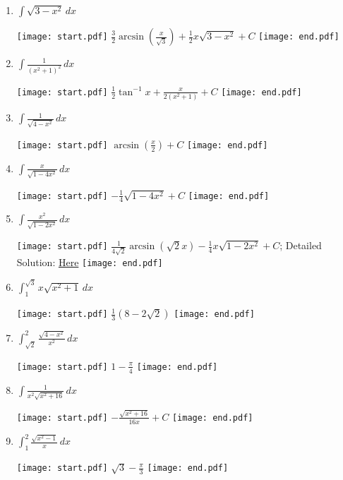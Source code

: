 \documentclass[12pt]{article}
\begin{document}
\begin{enumerate}

\item $\int \sqrt{3-x^2}\,dx$ 

\texttt{[image: start.pdf]}
{{$\frac{3}{2}\arcsin{\left(\frac{x}{\sqrt{3}}\right)}+\frac{1}{2}x\sqrt{3-x^2}+C$}}
\texttt{[image: end.pdf]}


\item $\int \frac{1}{(x^2+1)^2}\,dx$ 

\texttt{[image: start.pdf]}
{{$\frac{1}{2}\tan^{-1}{x}+\frac{x}{2(x^2+1)}+C$}}
\texttt{[image: end.pdf]}


\item $\int \frac{1}{\sqrt{4-x^2}}\,dx$ 

\texttt{[image: start.pdf]}
{{$\arcsin{\left(\frac{x}{2}\right)+C}$}}
\texttt{[image: end.pdf]}


\item $\int \frac{x}{\sqrt{1-4x^2}}\,dx$ 

\texttt{[image: start.pdf]}
{{$-\frac{1}{4}\sqrt{1-4x^2}+C$}}
\texttt{[image: end.pdf]}


\item $\int \frac{x^2}{\sqrt{1-2x^2}}\,dx$ 

\texttt{[image: start.pdf]}
{{$\frac{1}{4\sqrt{2}}\arcsin{(\sqrt{2}x)}-\frac{1}{4}x\sqrt{1-2x^2}+C$; Detailed Solution: \textcolor{blue}{\href{http://www.math.drexel.edu/classes/Calculus/resources/Math122HW/Solutions/122_16_Trig_Sub_05.pdf}{Here}}}}
\texttt{[image: end.pdf]}


\item $\int^{\sqrt{3}}_1 x\sqrt{x^2+1}\,dx$ 

\texttt{[image: start.pdf]}
{{$\frac{1}{3}(8-2\sqrt{2})$}}
\texttt{[image: end.pdf]}


\item $\int^2_{\sqrt{2}} \frac{\sqrt{4-x^2}}{x^2}\,dx$ 

\texttt{[image: start.pdf]}
{{$1-\frac{\pi}{4}$}}
\texttt{[image: end.pdf]}


\item $\int \frac{1}{x^2\sqrt{x^2+16}}\,dx$ 

\texttt{[image: start.pdf]}
{{$-\frac{\sqrt{x^2+16}}{16x}+C$}}
\texttt{[image: end.pdf]}


\item $\int_1^2 \frac{\sqrt{x^2-1}}{x}\,dx$ 

\texttt{[image: start.pdf]}
{{$\sqrt{3}-\frac{\pi}{3}$}}
\texttt{[image: end.pdf]}



\end{enumerate}
\end{document}
